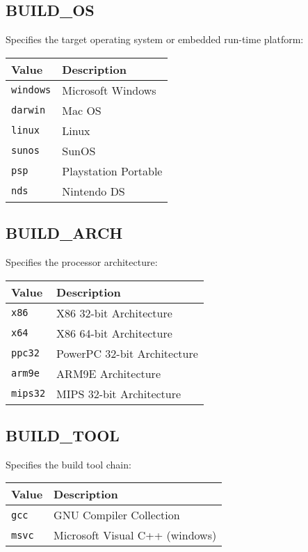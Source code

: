 \documentclass{article}
\newcommand{\val}[1]{{\tt #1}}
\begin{document}
\subsection{BUILD\_OS}

Specifies the target operating system or embedded run-time platform:

\begin{tabular}{ll}
Value         & Description           \\
\hline
\val{windows} & Microsoft Windows     \\
\val{darwin}  & Mac OS                \\
\val{linux}   & Linux                 \\
\val{sunos}   & SunOS                 \\
\val{psp}     & Playstation Portable  \\
\val{nds}     & Nintendo DS           \\
\end{tabular}

\subsection{BUILD\_ARCH}

Specifies the processor architecture:

\begin{tabular}{ll}
Value        & Description                 \\
\hline
\val{x86}    & X86 32-bit Architecture     \\
\val{x64}    & X86 64-bit Architecture     \\
\val{ppc32}  & PowerPC 32-bit Architecture \\
\val{arm9e}  & ARM9E Architecture          \\
\val{mips32} & MIPS 32-bit Architecture    \\
\end{tabular}

\subsection{BUILD\_TOOL}

Specifies the build tool chain:

\begin{tabular}{ll}
Value      & Description             \\
\hline
\val{gcc}  & GNU Compiler Collection \\
\val{msvc} & Microsoft Visual C++ (windows) \\
\end{tabular}
\end{document}
